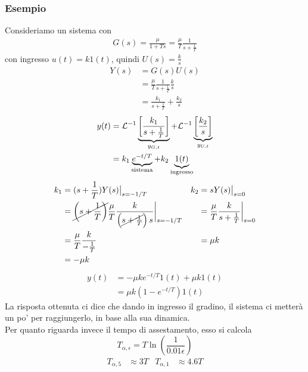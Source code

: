 \documentclass{article}
\numberwithin{equation}{subsection}
\begin{document}
\subsubsection{Esempio}
Consideriamo un sistema con 
\begin{align*}
    G(s) = \frac{\mu}{1+T s} = \frac{\mu}{T} \frac{1}{s+\frac{1}{T}}
\end{align*}
con ingresso $u(t)=k 1(t)$, quindi $U(s) = \frac{k}{s}$
\begin{align*}
    Y(s) 
    &= G(s) U(s)
    \\
    &=  \frac{\mu}{T} \frac{1}{s+\frac{1}{T}} \frac{k}{s}
    \\
    &= \frac{k_1}{s+\frac{1}{T}} + \frac{k_2}{s}
\end{align*}
\begin{align*}
    y(t)
    &= \mathcal{L}^{-1} \underbrace{\left[\frac{k_1}{s+\frac{1}{T}}\right]}_{y_{G,t}} + \mathcal{L}^{-1} \underbrace{\left[\frac{k_2}{s}\right]}_{y_{U,t}}
    \\
    &= k_1 \underbrace{e^{-t/T}}_{\text{sistema}} + k_2 \underbrace{1(t)}_{\text{ingresso}}
\end{align*}
\begin{align*}
    k_1 
    &= (s+\frac{1}{T})Y(s) \big|_{s=-1/T}
    &
    k_2
    &= sY(s) \big|_{s=0}
    \\
    &= \cancel{\left(s+\frac{1}{T}\right)}\frac{\mu}{T}\frac{k}{\left(\cancel{s+\frac{1}{T}}\right)s}\bigg|_{s=-1/T}&
    &=\frac{\mu}{T} \frac{k}{s+\frac{1}{T}} \bigg|_{s=0}
    \\
    &=\frac{\mu}{T} \frac{k}{-\frac{1}{T}}&
    &= \mu k
    \\
    &= -\mu k
\end{align*}
\begin{align*}
    y(t)
    &= - \mu k e^{-t/T}1(t) + \mu k 1(t)
    \\
    &= \mu k (1 - e^{-t/T}) 1(t)
\end{align*}
La risposta ottenuta ci dice che dando in ingresso il gradino, il sistema ci metterà un po' per raggiungerlo, in base alla sua dinamica.
\vspace*{0.1cm}\\
Per quanto riguarda invece il tempo di assestamento, esso si calcola
\[
    T_{\alpha,\epsilon} = T \ln \left(\frac{1}{0.01\epsilon}\right)    
\]
\begin{align*}
    T_{\alpha,5} &\approx 3T & T_{\alpha,1} &\approx 4.6T
\end{align*}
\end{document}
